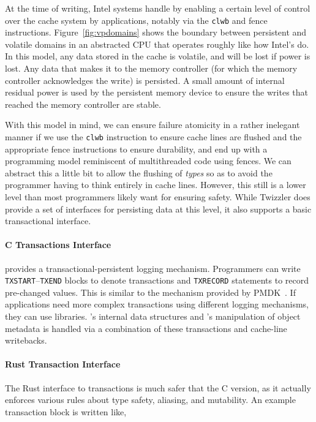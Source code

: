 At the time of writing, Intel systems handle \NVM by enabling a certain level of control over the cache system by
applications, notably via the \texttt{clwb} and fence instructions. Figure~\ref{fig:vpdomains} shows the boundary
between persistent and volatile domains in an abstracted CPU that operates roughly like how Intel's do. In this model,
any data stored in the cache is volatile, and will be lost if power is lost. Any data that makes it to the memory
controller (for which the memory controller acknowledges the write) is persisted. A small amount of internal residual
power is used by the persistent memory device to ensure the writes that reached the memory controller are stable.

With this model in mind, we can ensure failure atomicity in a rather inelegant manner if we use the \texttt{clwb}
instruction to ensure cache lines are flushed and the appropriate fence instructions to ensure durability, and end up
with a programming model reminiscent of multithreaded code using fences. We can abstract this a little bit to allow the
flushing of \emph{types} so as to avoid the programmer having to think entirely in cache lines. However, this still is a
lower level than most programmers likely want for ensuring safety. While Twizzler does provide a set of interfaces for
persisting data at this level, it also supports a basic transactional interface.


\paragraph{C Transactions Interface}
\Twizzler provides a transactional-persistent logging mechanism.
Programmers can write \texttt{TXSTART}--\texttt{TXEND} blocks to denote transactions and \texttt{TXRECORD}
statements to record pre-changed values. This is similar to the mechanism provided by
PMDK~\cite{libpmem}. If applications need more complex
transactions using different logging mechanisms, they can use libraries. \Twizzler's internal data
structures and \libcore's manipulation of object metadata is handled via a combination of these
transactions and cache-line writebacks.


\paragraph{Rust Transaction Interface}

The Rust interface to transactions is much safer that the C version, as it actually enforces various rules about type
safety, aliasing, and mutability. An example transaction block is written like,

